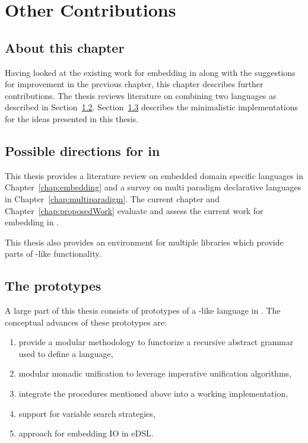 \documentclass[thesis-solanki.tex]{subfiles}
\begin{document}
\chapter{Other Contributions}\label{chap:accomplishedWork}

\section{About this chapter}\label{sec:what-this-chapter:accomplishedWork}

Having looked at the existing work for embedding  in  along with the suggestions
for improvement in the previous chapter, this chapter describes further contributions.
The thesis reviews literature on combining two languages as described in Section~\ref{sec:work-in-points}.
Section~\ref{sec:prototypes} describes the minimalistic implementations for the ideas presented in this thesis.

\section{Possible directions for  in }\label{sec:work-in-points}

This thesis provides a literature review on embedded domain specific languages in Chapter~\ref{chap:embedding} and
a survey on multi paradigm declarative languages in Chapter~\ref{chap:multiparadigm}.
The current chapter and Chapter~\ref{chap:proposedWork} evaluate and assess the current work for embedding
 in .

This thesis also provides an environment for multiple  libraries which provide parts of
-like functionality.


\section{The prototypes}\label{sec:prototypes}
A large part of this thesis consists of prototypes of a -like language in .
The conceptual advances of these prototypes are:
\begin{enumerate}
\item provide a modular methodology to functorize a recursive abstract grammar used to define a language,

\item modular monadic unification to leverage imperative unification algorithms,

\item integrate the procedures mentioned above into a working  implementation,

\item support for variable search strategies,

\item approach for embedding IO in eDSL.

\end{enumerate}
\end{document}

